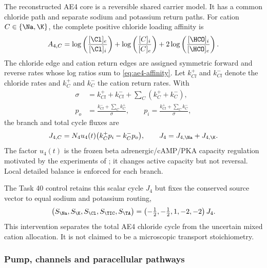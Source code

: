 The reconstructed AE4 core is a reversible shared carrier model. It has a common chloride path and separate sodium and potassium return paths. For cation $C\in\{\Na,\K\}$, the complete positive chloride loading affinity is
\begin{equation}
\label{eq:ae4-affinity}
A_{4,C}=\log\left(\frac{[\Cl]_e}{[\Cl]_i}\right)
+\log\left(\frac{[C]_i}{[C]_e}\right)
+2\log\left(\frac{[\HCO]_i}{[\HCO]_e}\right).
\end{equation}
The chloride edge and cation return edges are assigned symmetric forward and reverse rates whose log ratios sum to \cref{eq:ae4-affinity}. Let $k_{Cl}^{+}$ and $k_{Cl}^{-}$ denote the chloride rates and $k_C^{+}$ and $k_C^{-}$ the cation return rates. With
\begin{align*}
\sigma&=k_{Cl}^{+}+k_{Cl}^{-}+\sum_C(k_C^{+}+k_C^{-}),\\
p_o&=\frac{k_{Cl}^{-}+\sum_C k_C^{+}}{\sigma},\qquad
p_i=\frac{k_{Cl}^{+}+\sum_C k_C^{-}}{\sigma},
\end{align*}
the branch and total cycle fluxes are
\begin{equation}
\label{eq:ae4-qss}
J_{4,C}=N_4u_4(t)\bigl(k_C^{+}p_i-k_C^{-}p_o\bigr),
\qquad J_4=J_{4,\Na}+J_{4,\K}.
\end{equation}
The factor $u_4(t)$ is the frozen beta adrenergic/cAMP/PKA capacity regulation motivated by the experiments of \citet{PenaMunzenmayer2021}; it changes active capacity but not reversal. Local detailed balance is enforced for each branch.

The Task 40 control retains this scalar cycle $J_4$ but fixes the conserved source vector to equal sodium and potassium routing,
\begin{equation}
\label{eq:ae4-equal-source}
\bigl(S_{\Na},S_{\K},S_{\Cl},S_{\TIC},S_{\TA}\bigr)
=\left(-\tfrac12,-\tfrac12,1,-2,-2\right)J_4.
\end{equation}
This intervention separates the total AE4 chloride cycle from the uncertain mixed cation allocation. It is not claimed to be a microscopic transport stoichiometry.

\subsubsection{Pump, channels and paracellular pathways}

